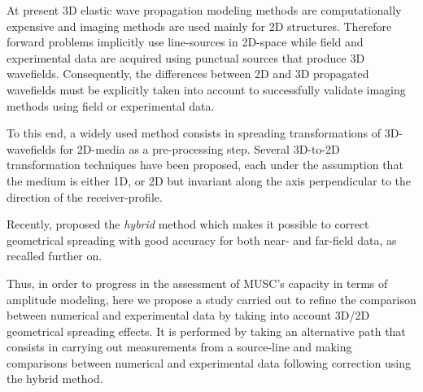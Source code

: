 \documentclass[paper,extra]{gji} %
\begin{document}


\noindent At present 3D elastic wave propagation modeling methods are computationally expensive and imaging methods are used mainly for 2D structures. Therefore forward problems implicitly use line-sources in 2D-space while field and experimental data are acquired using punctual sources that produce 3D wavefields. Consequently, the differences between 2D and 3D propagated wavefields must be explicitly taken into account to successfully validate imaging methods using field or experimental data. 


\noindent To this end, a widely used method consists in spreading transformations of 3D-wavefields for 2D-media as a pre-processing step. Several 3D-to-2D transformation techniques have been proposed, each under the assumption that the medium is either 1D, or 2D but invariant along the axis perpendicular to the direction of the receiver-profile.

\noindent Recently, \citet{Forbriger_LSS_2014} proposed the \textit{hybrid} method which makes it possible to correct geometrical spreading with good accuracy for both near- and far-field data, as recalled further on.

\noindent Thus, in order to progress in the assessment of MUSC’s capacity in terms of amplitude modeling, here we propose a study carried out to refine the comparison between numerical and experimental data by taking into account 3D/2D geometrical spreading effects. It is performed by taking an alternative path that consists in carrying out measurements from a source-line and making comparisons between numerical and experimental data following correction using the hybrid method.
\end{document}
